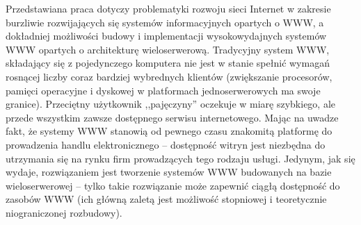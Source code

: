 Przedstawiana praca dotyczy problematyki rozwoju sieci Internet w zakresie burzliwie rozwijających się systemów 
informacyjnych opartych o WWW, a dokładniej możliwości budowy i implementacji wysokowydajnych systemów WWW opartych
o architekturę wieloserwerową. Tradycyjny system WWW, składający się z pojedynczego komputera nie jest w stanie spełnić
wymagań rosnącej liczby coraz bardziej wybrednych klientów (zwiększanie procesorów, pamięci operacyjne i dyskowej w platformach
jednoserwerowych ma swoje granice). Przeciętny użytkownik ,,pajęczyny'' oczekuje w miarę 
szybkiego,
ale przede wszystkim zawsze dostępnego serwisu internetowego. Mając na uwadze fakt, że systemy WWW stanowią od pewnego czasu
znakomitą platformę do prowadzenia handlu elektronicznego -- dostępność witryn jest niezbędna do utrzymania się na rynku firm 
prowadzących tego rodzaju usługi. Jedynym, jak się wydaje, rozwiązaniem jest tworzenie systemów WWW budowanych
na bazie wieloserwerowej -- tylko takie rozwiązanie może zapewnić ciągłą dostępność do zasobów WWW (ich główną zaletą
jest możliwość stopniowej i teoretycznie niograniczonej rozbudowy).

